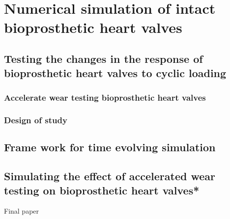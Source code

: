 \chapter{Numerical simulation of intact bioprosthetic heart valves}

\section{Testing the changes in the response of bioprosthetic heart valves to cyclic loading}
\subsection{Accelerate wear testing bioprosthetic heart valves}
\subsection{Design of study}

\section{Frame work for time evolving simulation}

\section{Simulating the effect of accelerated wear testing on bioprosthetic heart valves*}

Final paper